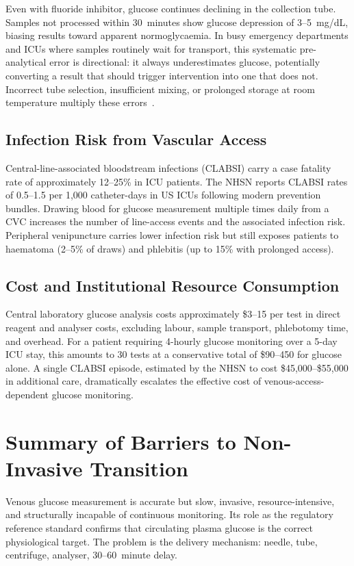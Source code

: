 Even with fluoride inhibitor, glucose continues declining in the collection tube. Samples not processed within 30~minutes show glucose depression of 3--5~mg/dL, biasing results toward apparent normoglycaemia. In busy emergency departments and ICUs where samples routinely wait for transport, this systematic pre-analytical error is directional: it always underestimates glucose, potentially converting a result that should trigger intervention into one that does not. Incorrect tube selection, insufficient mixing, or prolonged storage at room temperature multiply these errors~\cite{iso15197standard}.

\subsection*{Infection Risk from Vascular Access}

Central-line-associated bloodstream infections (CLABSI) carry a case fatality rate of approximately 12--25\% in ICU patients. The NHSN reports CLABSI rates of 0.5--1.5 per 1,000 catheter-days in US ICUs following modern prevention bundles. Drawing blood for glucose measurement multiple times daily from a CVC increases the number of line-access events and the associated infection risk. Peripheral venipuncture carries lower infection risk but still exposes patients to haematoma (2--5\% of draws) and phlebitis (up to 15\% with prolonged access).

\subsection*{Cost and Institutional Resource Consumption}

Central laboratory glucose analysis costs approximately \$3--15 per test in direct reagent and analyser costs, excluding labour, sample transport, phlebotomy time, and overhead. For a patient requiring 4-hourly glucose monitoring over a 5-day ICU stay, this amounts to 30 tests at a conservative total of \$90--450 for glucose alone. A single CLABSI episode, estimated by the NHSN to cost \$45,000--\$55,000 in additional care, dramatically escalates the effective cost of venous-access-dependent glucose monitoring.

\section{Summary of Barriers to Non-Invasive Transition}

Venous glucose measurement is accurate but slow, invasive, resource-intensive, and structurally incapable of continuous monitoring. Its role as the regulatory reference standard confirms that circulating plasma glucose is the correct physiological target. The problem is the delivery mechanism: needle, tube, centrifuge, analyser, 30--60~minute delay.

